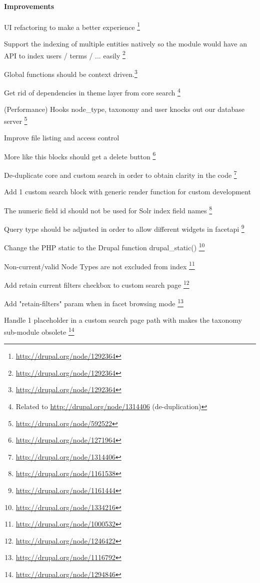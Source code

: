 \paragraph{Improvements}
\begin{packed_itemize}
\item UI refactoring to make a better experience \footnote{\url{http://drupal.org/node/1292364}}
\item Support the indexing of multiple entities natively so the module would have an API to index users / terms / ... easily \footnote{\url{http://drupal.org/node/1292364}}
\item Global functions should be context driven.\footnote{\url{http://drupal.org/node/1292364}}
\item Get rid of dependencies in theme layer from core search \footnote{Related to \url{http://drupal.org/node/1314406} (de-duplication)}
\item (Performance) Hooks node\_type, taxonomy and user knocks out our database server \footnote{\url{http://drupal.org/node/592522}}
\item Improve file listing and access control
\item More like this blocks should get a delete button \footnote{\url{http://drupal.org/node/1271964}}
\item De-duplicate core and custom search in order to obtain clarity in the code \footnote{\url{http://drupal.org/node/1314406}}
\item Add 1 custom search block with generic render function for custom development
\item The numeric field id should not be used for Solr index field names \footnote{\url{http://drupal.org/node/1161538}}
\item Query type should be adjusted in order to allow different widgets in facetapi \footnote{\url{http://drupal.org/node/1161444}}
\item Change the PHP static to the Drupal function drupal\_static() \footnote{\url{http://drupal.org/node/1334216}}
\item Non-current/valid Node Types are not excluded from index \footnote{\url{http://drupal.org/node/1000532}}
\item Add retain current filters checkbox to custom search page \footnote{\url{http://drupal.org/node/1246422}}
\item Add "retain-filters" param when in facet browsing mode \footnote{\url{http://drupal.org/node/1116792}}
\item Handle 1 placeholder in a custom search page path with makes the taxonomy sub-module obsolete \footnote{\url{http://drupal.org/node/1294846}}

\end{packed_itemize}
